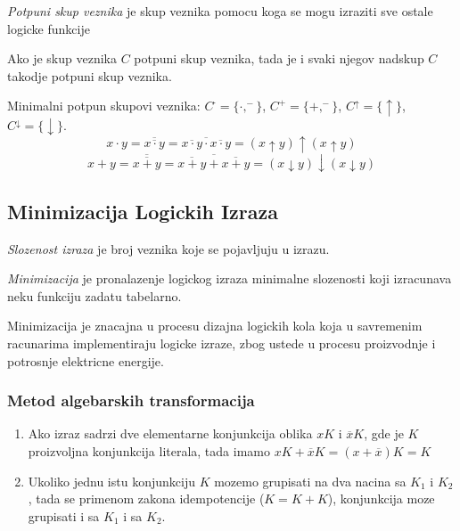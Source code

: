 \documentclass[12p,a4paper]{article}
\begin{document}
\begin{multicols}{2}
    \emph{Potpuni skup veznika} je skup veznika pomocu koga se mogu izraziti
    sve ostale logicke funkcije

    Ako je skup veznika $C$ potpuni skup veznika, tada je i svaki njegov 
    nadskup $C$ takodje potpuni skup veznika.

    Minimalni potpun skupovi veznika: $C^\cdot = \{\cdot, ^-\}$, 
    $C^+ = \{+, ^-\}$, $C^\uparrow = \{\uparrow\}$, 
    $C^\downarrow = \{\downarrow\}$.
    \[
        x \cdot y = 
        \overline{\overline{x \cdot y}} = 
        \overline{\overline{x \cdot y} \cdot \overline{x \cdot y}} =
        (x \uparrow y) \uparrow (x \uparrow y)
    \]
    \[
        x + y =
        \overline{\overline{x + y}} =
        \overline{\overline{x + y} + \overline{x + y}} =
        (x \downarrow y) \downarrow (x \downarrow y)
    \]

    
    \subsection{Minimizacija Logickih Izraza}

    \emph{Slozenost izraza} je broj veznika koje se pojavljuju u izrazu.

    \emph{Minimizacija} je pronalazenje logickog izraza minimalne slozenosti
    koji izracunava neku funkciju zadatu tabelarno.

    Minimizacija je znacajna u procesu dizajna logickih kola koja u 
    savremenim racunarima implementiraju logicke izraze, zbog ustede u 
    procesu proizvodnje i potrosnje elektricne energije.

    \subsubsection{Metod algebarskih transformacija}
    
    \begin{enumerate}
        \itemsep0em
        \item Ako izraz sadrzi dve elementarne konjunkcija oblika $xK$ i 
              $\overline{x}K$, gde je $K$ proizvoljna konjunkcija literala, 
              tada imamo $xK + \overline{x}K = (x + \overline{x})K = K$
        \item Ukoliko jednu istu konjunkciju $K$ mozemo grupisati na dva nacina
              sa $K_1$ i $K_2$, tada se primenom zakona idempotencije 
              ($K = K + K$), konjunkcija moze grupisati i sa $K_1$ i sa $K_2$.
    \end{enumerate}


\end{multicols}
\end{document}
